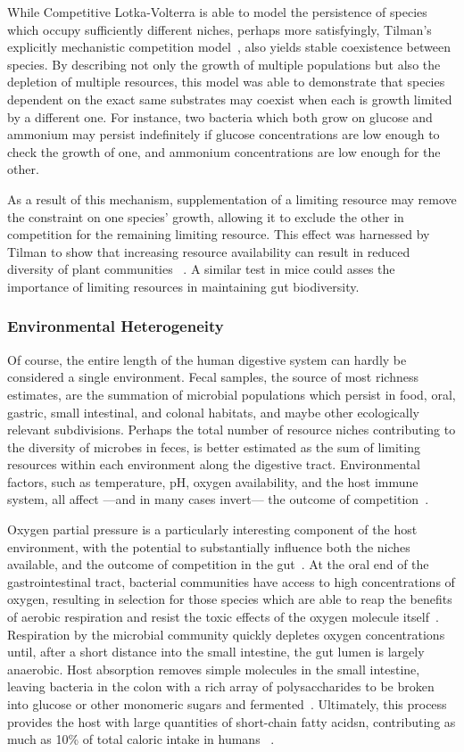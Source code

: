 \documentclass[12pt]{article}
\begin{document}
While Competitive Lotka-Volterra is able to model the
persistence of species which occupy sufficiently different
niches,
perhaps more satisfyingly,
Tilman's explicitly mechanistic competition model~\citep{Tilman1977},
also yields stable coexistence between species.
By describing not only the growth of multiple populations
but also the depletion of multiple resources,
this model was able to demonstrate that
species dependent on the exact same substrates may coexist
when each is growth limited by a different one.
For instance, two bacteria which both grow on glucose and
ammonium may persist indefinitely if glucose concentrations are
low enough to check the growth of one, and ammonium
concentrations are low enough for the other.

As a result of this mechanism, supplementation of a
limiting resource may remove the constraint on one species'
growth, allowing it to exclude the other in competition for
the remaining limiting resource.
This effect was harnessed by Tilman to show that increasing
resource availability can result in reduced diversity of plant communities%
~\citep{Harpole2007}.
A similar test in mice could asses the importance of limiting
resources in maintaining gut biodiversity.

\subsubsection{Environmental Heterogeneity}
Of course, the entire length of the human digestive system can
hardly be considered a single environment.
Fecal samples, the source of most richness estimates, are the
summation of microbial populations which persist in
food, oral, gastric, small intestinal, and colonal habitats,
and maybe other ecologically relevant subdivisions.
Perhaps the total number of resource niches contributing
to the diversity of microbes in feces,
is better estimated as the sum of limiting resources
within each environment along the digestive tract.
Environmental factors, such as temperature, pH,
oxygen availability, and the host immune system,
all affect%
---and in many cases invert---%
the outcome of competition~\citep{Human2012}.

Oxygen partial pressure is a particularly interesting
component of the host environment, with the potential
to substantially influence both the niches available,
and the outcome of competition in the gut~\citep{Espey2013}.
At the oral end of the gastrointestinal tract, bacterial
communities have access to high concentrations of oxygen,
resulting in selection for those species which are able to
reap the benefits of aerobic respiration
and resist the toxic effects of the oxygen molecule itself~\citep{Zhang2014}.
Respiration by the microbial community quickly depletes
oxygen concentrations until,
after a short distance into the small intestine,
the gut lumen is largely anaerobic.
Host absorption removes simple molecules in the small
intestine,
leaving bacteria in the colon with a
rich array of polysaccharides to be broken into glucose or
other monomeric sugars and fermented~\citep[reviewed in][]{Macfarlane2012}.
Ultimately, this process provides the host with large
quantities of short-chain fatty acidsn,
contributing as much as 10\% of total caloric intake in humans%
~\citep{McNeil1984}.
\end{document}
